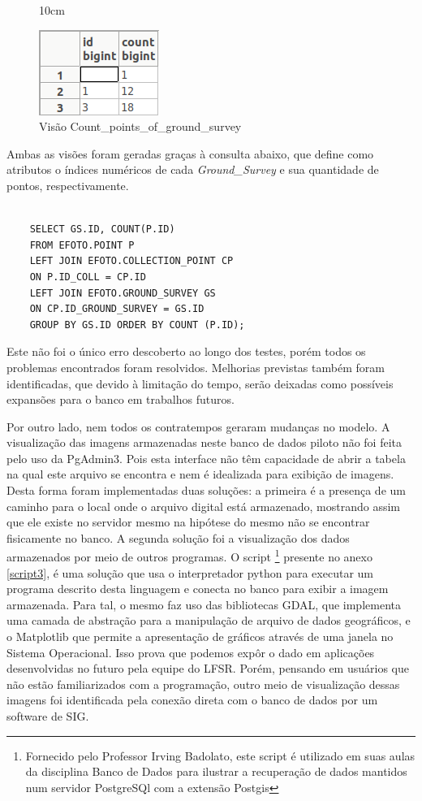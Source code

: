 \begin{figure}[!ht]{10cm}
  \caption{Visão Count\_points\_of\_ground\_survey} \label{pgs_correto}
  \centering
  \includegraphics[width=0.3\hsize]{figuras/pgs_correto.png}
\end{figure}

Ambas as visões foram geradas graças à consulta abaixo, que define como atributos o índices numéricos de cada \textit{Ground\_Survey} e sua quantidade de pontos, respectivamente.

\begin{lstlisting}

    SELECT GS.ID, COUNT(P.ID)
    FROM EFOTO.POINT P
    LEFT JOIN EFOTO.COLLECTION_POINT CP
    ON P.ID_COLL = CP.ID
    LEFT JOIN EFOTO.GROUND_SURVEY GS
    ON CP.ID_GROUND_SURVEY = GS.ID
    GROUP BY GS.ID ORDER BY COUNT (P.ID);

\end{lstlisting}
Este não foi o único erro descoberto ao longo dos testes, porém todos os problemas encontrados foram resolvidos. Melhorias previstas também foram identificadas, que devido à limitação do tempo, serão deixadas como possíveis expansões para o banco em trabalhos futuros.

Por outro lado, nem todos os contratempos geraram mudanças no modelo. A visualização das imagens armazenadas neste banco de dados piloto não foi feita pelo uso da PgAdmin3. Pois esta interface não têm capacidade de abrir a tabela na qual este arquivo se encontra e nem é idealizada para exibição de imagens. Desta forma foram implementadas duas soluções: a primeira é a presença de um caminho para o local onde o arquivo digital está armazenado, mostrando assim que ele existe no servidor mesmo na hipótese do mesmo não se encontrar fisicamente no banco. A segunda solução foi a visualização dos dados armazenados por meio de outros programas. O script \footnote{Fornecido pelo Professor Irving Badolato, este script é utilizado em suas aulas da disciplina Banco de Dados para ilustrar a recuperação de dados mantidos num servidor PostgreSQl com a extensão Postgis} presente no anexo \ref{script3}, é uma solução que usa o interpretador python para executar um programa descrito desta linguagem e conecta no banco para exibir a imagem armazenada. Para tal, o mesmo faz uso das bibliotecas GDAL, que implementa uma camada de abstração para a manipulação de arquivo de dados geográficos, e o Matplotlib que permite a apresentação de gráficos através de uma janela no Sistema Operacional. Isso prova que podemos expôr o dado em aplicações desenvolvidas no futuro pela equipe do LFSR. Porém, pensando em usuários que não estão familiarizados com a programação, outro meio de visualização dessas imagens foi identificada pela conexão direta com o banco de dados por um software de SIG.

